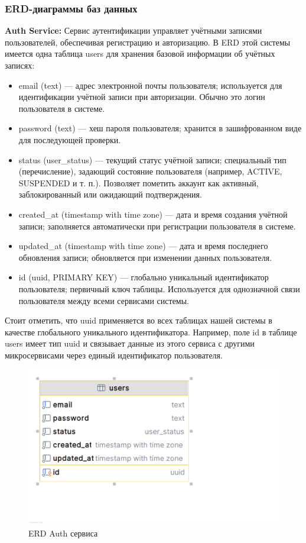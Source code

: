 \subsubsection*{ERD-диаграммы баз данных}
\textbf{Auth Service:} Сервис аутентификации управляет учётными записями пользователей, обеспечивая регистрацию и авторизацию. В ERD этой системы имеется одна таблица users для хранения базовой информации об учётных записях:
\begin{itemize}
    \item email (text) — адрес электронной почты пользователя; используется для идентификации учётной записи при авторизации. Обычно это логин пользователя в системе.
    \item password (text) — хеш пароля пользователя; хранится в зашифрованном виде для последующей проверки.
    \item status (user\_status) — текущий статус учётной записи; специальный тип (перечисление), задающий состояние пользователя (например, ACTIVE, SUSPENDED и т. п.). Позволяет пометить аккаунт как активный, заблокированный или ожидающий подтверждения.
    \item created\_at (timestamp with time zone) — дата и время создания учётной записи; заполняется автоматически при регистрации пользователя в системе.
    \item updated\_at (timestamp with time zone) — дата и время последнего обновления записи; обновляется при изменении данных пользователя.
    \item id (uuid, PRIMARY KEY) — глобально уникальный идентификатор пользователя; первичный ключ таблицы. Используется для однозначной связи пользователя между всеми сервисами системы.
\end{itemize}
\noindent Стоит отметить, что uuid применяется во всех таблицах нашей системы в качестве глобального уникального идентификатора. Например, поле id в таблице users имеет тип uuid и связывает данные из этого сервиса с другими микросервисами через единый идентификатор пользователя.
\begin{figure}[H]
        \centering
        \includegraphics[width=0.8\linewidth]{Images/second_chapter_backend_architecture/Picture10.png}
        \caption{ERD Auth сервиса}
        \label{fig:auth-service-erd}
\end{figure}

